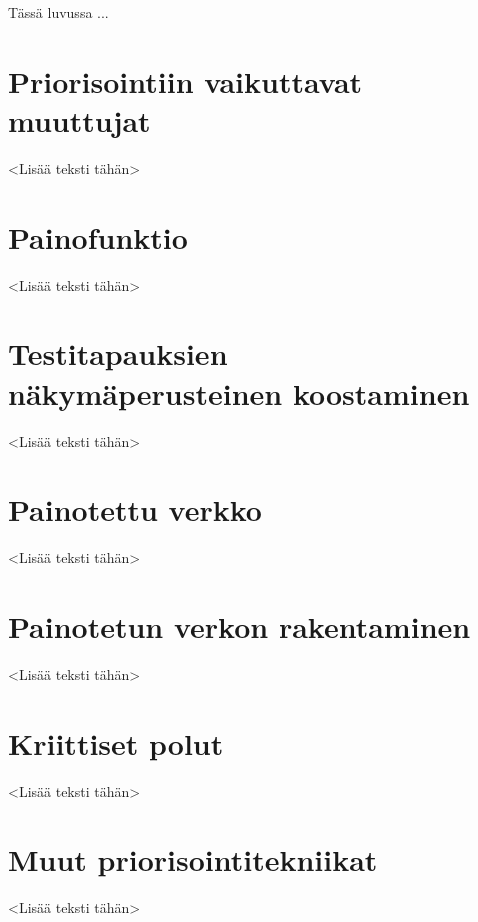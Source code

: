 Tässä luvussa ...

\section{Priorisointiin vaikuttavat muuttujat}

<Lisää teksti tähän>

\section{Painofunktio}

<Lisää teksti tähän>

\section{Testitapauksien näkymäperusteinen koostaminen}

<Lisää teksti tähän>

\section{Painotettu verkko}

<Lisää teksti tähän>

\section{Painotetun verkon rakentaminen}

<Lisää teksti tähän>

\section{Kriittiset polut}

<Lisää teksti tähän>

\section{Muut priorisointitekniikat}

<Lisää teksti tähän>
